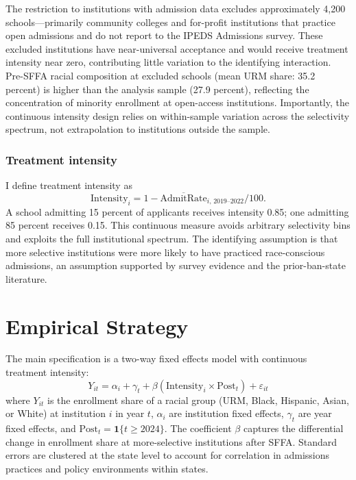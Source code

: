 \documentclass[12pt]{article}
\begin{document}
The restriction to institutions with admission data excludes approximately 4,200 schools---primarily community colleges and for-profit institutions that practice open admissions and do not report to the IPEDS Admissions survey. These excluded institutions have near-universal acceptance and would receive treatment intensity near zero, contributing little variation to the identifying interaction. Pre-SFFA racial composition at excluded schools (mean URM share: 35.2 percent) is higher than the analysis sample (27.9 percent), reflecting the concentration of minority enrollment at open-access institutions. Importantly, the continuous intensity design relies on within-sample variation across the selectivity spectrum, not extrapolation to institutions outside the sample.

\subsubsection*{Treatment intensity} I define treatment intensity as
\[
\text{Intensity}_i = 1 - \overline{\text{AdmitRate}}_{i,\,2019\text{--}2022} / 100.
\]
A school admitting 15 percent of applicants receives intensity 0.85; one admitting 85 percent receives 0.15. This continuous measure avoids arbitrary selectivity bins and exploits the full institutional spectrum. The identifying assumption is that more selective institutions were more likely to have practiced race-conscious admissions, an assumption supported by survey evidence and the prior-ban-state literature.

\section{Empirical Strategy}

The main specification is a two-way fixed effects model with continuous treatment intensity:
\begin{equation}
Y_{it} = \alpha_i + \gamma_t + \beta \left(\text{Intensity}_i \times \text{Post}_t\right) + \varepsilon_{it}
\label{eq:main}
\end{equation}
where $Y_{it}$ is the enrollment share of a racial group (URM, Black, Hispanic, Asian, or White) at institution $i$ in year $t$, $\alpha_i$ are institution fixed effects, $\gamma_t$ are year fixed effects, and $\text{Post}_t = \mathbf{1}\{t \geq 2024\}$. The coefficient $\beta$ captures the differential change in enrollment share at more-selective institutions after SFFA. Standard errors are clustered at the state level to account for correlation in admissions practices and policy environments within states.
\end{document}
